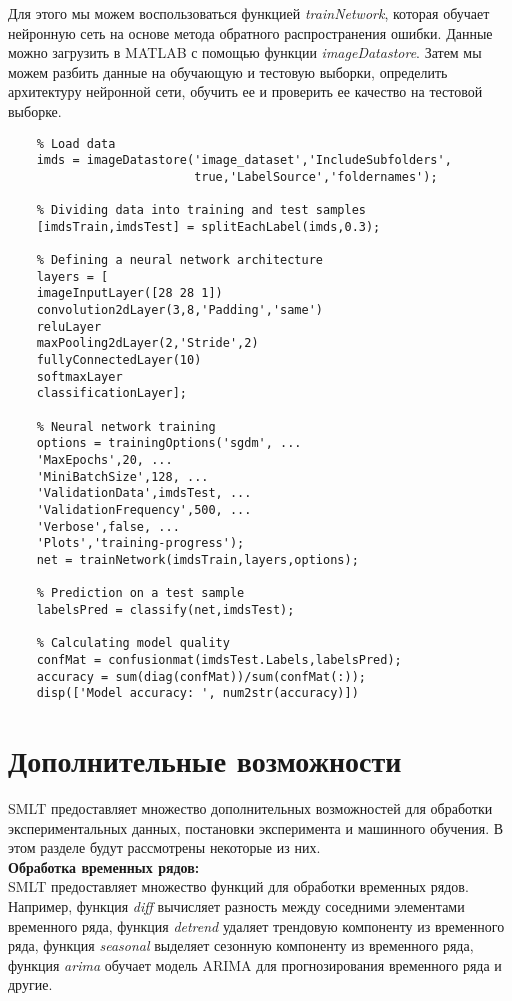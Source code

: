 \documentclass[a4paper, 12pt]{article}%
\begin{document}
\begin{titlepage}
	Для этого мы можем воспользоваться функцией \textit{trainNetwork}, которая обучает нейронную сеть на основе метода обратного распространения ошибки. Данные можно загрузить в MATLAB с помощью функции \textit{imageDatastore}. Затем мы можем разбить данные на обучающую и тестовую выборки, определить архитектуру нейронной сети, обучить ее и проверить ее качество на тестовой выборке.\\
	
	
	\begin{lstlisting}
	% Load data
	imds = imageDatastore('image_dataset','IncludeSubfolders',
						  true,'LabelSource','foldernames');
	
	% Dividing data into training and test samples
	[imdsTrain,imdsTest] = splitEachLabel(imds,0.3);
	
	% Defining a neural network architecture
	layers = [
	imageInputLayer([28 28 1])
	convolution2dLayer(3,8,'Padding','same')
	reluLayer
	maxPooling2dLayer(2,'Stride',2)
	fullyConnectedLayer(10)
	softmaxLayer
	classificationLayer];
	
	% Neural network training
	options = trainingOptions('sgdm', ...
	'MaxEpochs',20, ...
	'MiniBatchSize',128, ...
	'ValidationData',imdsTest, ...
	'ValidationFrequency',500, ...
	'Verbose',false, ...
	'Plots','training-progress');
	net = trainNetwork(imdsTrain,layers,options);
	
	% Prediction on a test sample
	labelsPred = classify(net,imdsTest);
	
	% Calculating model quality
	confMat = confusionmat(imdsTest.Labels,labelsPred);
	accuracy = sum(diag(confMat))/sum(confMat(:));
	disp(['Model accuracy: ', num2str(accuracy)])
	\end{lstlisting}
	
	
	\section{Дополнительные возможности}
	
	SMLT предоставляет множество дополнительных возможностей для обработки экспериментальных данных, постановки эксперимента и машинного обучения. В этом разделе будут рассмотрены некоторые из них.\\
	
	\textbf{Обработка временных рядов:}\\
	SMLT предоставляет множество функций для обработки временных рядов. Например, функция \textit{diff} вычисляет разность между соседними элементами временного ряда, функция \textit{detrend} удаляет трендовую компоненту из временного ряда, функция \textit{seasonal} выделяет сезонную компоненту из временного ряда, функция \textit{arima} обучает модель ARIMA для прогнозирования временного ряда и другие.
	

\end{titlepage}
\end{document}
